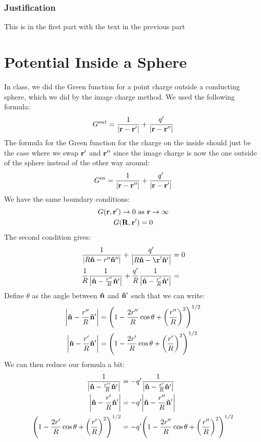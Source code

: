 \documentclass[12pt]{article}
\begin{document}
\subsubsection{Justification}
This is in the first part with the text in the previous part
\section{Potential Inside a Sphere}
In class, we did the Green function for a point charge outside a conducting sphere, which we did by the image charge method. We used the following formula:
\begin{align*}
  G^{out}=\frac1{\abs{\vb{r-r}'}}+\frac{q'}{\abs{\vb{r-r}''}}
\end{align*}
The formula for the Green function for the charge on the inside should just be the case where we swap $\vb{r}'$ and $\vb{r}''$ since the image charge is now the one outside of the sphere instead of the other way around:
\begin{align*}
  G^{in}=\frac1{\abs{\vb{r-r}''}}+\frac{q'}{\abs{\vb{r-r}'}}
\end{align*}
We have the same boundary conditions:
\begin{gather*}
  G(\vb{r,r}')\to0 \text{ as } \vb{r}\to\infty\\
  G(\vb{R,r}')=0
\end{gather*}
The second condition gives:
\begin{align*}
  \frac1{\abs{R\vu{n}-r''\vu{n}''}}+\frac{q'}{\abs{R\vu{n}-\r'\vu{n}'}}&=0\\
  \frac1R\frac1{\abs{\vu{n}-\frac{r''}{R}\vu{n}'}}
  +\frac{q'}R\frac1{\abs{\vu{n}-\frac{r'}{R}\vu{n}'}}&=
\end{align*}
Define $\theta$ as the angle between $\vu{n}$ and $\vu{n}'$ such that we can write:
\begin{align*}
  \abs{\vu{n}-\frac{r''}R\vu{n}'}&=
  \qty(1-\frac{2r''}R\cos\theta+\qty(\frac{r''}R)^2)^{1/2}\\
  \abs{\vu{n}-\frac{r'}R\vu{n}'}&=
  \qty(1-\frac{2r'}R\cos\theta+\qty(\frac{r'}R)^2)^{1/2}
\end{align*}
We can then reduce our formula a bit:
\begin{align*}
  \frac1{\abs{\vu{n}-\frac{r''}{R}\vu{n}'}}&=-
  q'\frac1{\abs{\vu{n}-\frac{r'}{R}\vu{n}'}}\\
  \abs{\vu{n}-\frac{r'}{R}\vu{n}'}&=-q'\abs{\vu{n}-\frac{r''}{R}\vu{n}'}\\
  \qty(1-\frac{2r'}R\cos\theta+\qty(\frac{r'}R)^2)^{1/2}&=
  -q'\qty(1-\frac{2r''}R\cos\theta+\qty(\frac{r''}R)^2)^{1/2}\\
\end{align*}
\end{document}
